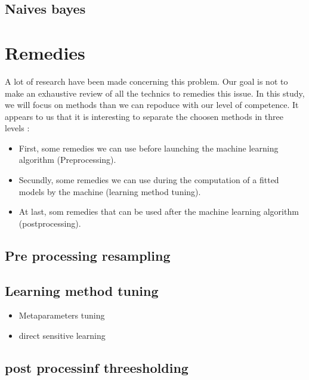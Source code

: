 \documentclass[
]{book}
\providecommand{\tightlist}{%
  \setlength{\itemsep}{0pt}\setlength{\parskip}{0pt}}
\begin{document}
\hypertarget{naives-bayes}{%
\section{Naives bayes}\label{naives-bayes}}

\hypertarget{remedies}{%
\chapter{Remedies}\label{remedies}}

A lot of research have been made concerning this problem. Our goal is not to make an exhaustive review of all the technics to remedies this issue.
In this study, we will focus on methods than we can repoduce with our level of competence. It appears to us that it is interesting to separate the choosen methods in three levels :

\begin{itemize}
\tightlist
\item
  First, some remedies we can use before launching the machine learning algorithm (Preprocessing).
\item
  Secundly, some remedies we can use during the computation of a fitted models by the machine (learning method tuning).
\item
  At last, som remedies that can be used after the machine learning algorithm (postprocessing).
\end{itemize}

\hypertarget{pre-processing-resampling}{%
\section{Pre processing resampling}\label{pre-processing-resampling}}

\hypertarget{learning-method-tuning}{%
\section{Learning method tuning}\label{learning-method-tuning}}

\begin{itemize}
\tightlist
\item
  Metaparameters tuning
\item
  direct sensitive learning
\end{itemize}

\hypertarget{post-processinf-threesholding}{%
\section{post processinf threesholding}\label{post-processinf-threesholding}}
\end{document}
